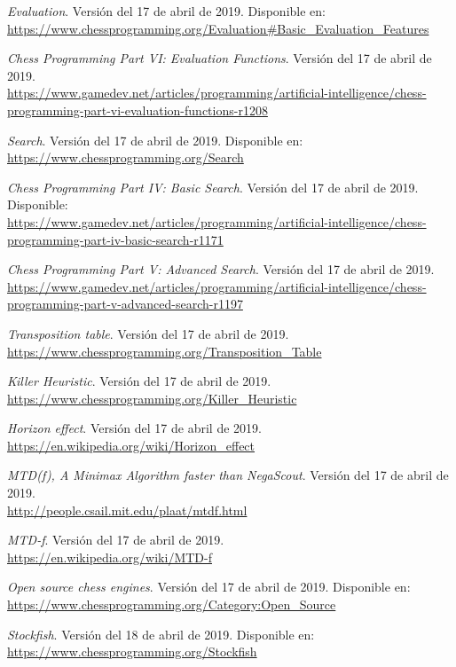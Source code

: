 \documentclass[letterpaper,12pt]{article}
\begin{document}
\begin{thebibliography}{99}
\textit{Evaluation}. Versión del 17 de abril de 2019. Disponible en: \\
\url{https://www.chessprogramming.org/Evaluation#Basic_Evaluation_Features}

\textit{Chess Programming Part VI: Evaluation Functions}. Versión del 17 de abril de 2019.
\\ \url{https://www.gamedev.net/articles/programming/artificial-intelligence/chess-programming-part-vi-evaluation-functions-r1208}

\textit{Search}. Versión del 17 de abril de 2019. Disponible en: \\
\url{https://www.chessprogramming.org/Search}

\textit{Chess Programming Part IV: Basic Search}. Versión del 17 de abril de 2019.
Disponible: \\ \url{https://www.gamedev.net/articles/programming/artificial-intelligence/chess-programming-part-iv-basic-search-r1171}

\textit{Chess Programming Part V: Advanced Search}. Versión del 17 de abril de 2019. \\
\url{https://www.gamedev.net/articles/programming/artificial-intelligence/chess-programming-part-v-advanced-search-r1197}

\textit{Transposition table}. Versión del 17 de abril de 2019. \\
\url{https://www.chessprogramming.org/Transposition_Table}

\textit{Killer Heuristic}. Versión del 17 de abril de 2019. \\
\url{https://www.chessprogramming.org/Killer_Heuristic}

\textit{Horizon effect}. Versión del 17 de abril de 2019. \\
\url{https://en.wikipedia.org/wiki/Horizon_effect}

\textit{MTD(f), A Minimax Algorithm faster than NegaScout}. Versión del 17 de abril de 2019. \\
\url{http://people.csail.mit.edu/plaat/mtdf.html}

\textit{MTD-f}. Versión del 17 de abril de 2019. \\
\url{https://en.wikipedia.org/wiki/MTD-f}


\textit{Open source chess engines}. Versión del 17 de abril de 2019. Disponible en: \\
\url{https://www.chessprogramming.org/Category:Open_Source}

\textit{Stockfish}. Versión del 18 de abril de 2019. Disponible en: \\
\url{https://www.chessprogramming.org/Stockfish}

\end{thebibliography}
\end{document}
